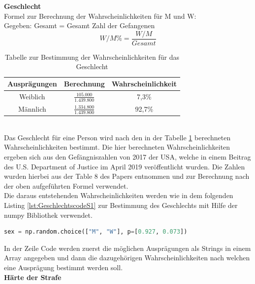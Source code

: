\begin{onehalfspace}
\textbf{Geschlecht}\\
Formel zur Berechnung der Wahrscheinlichkeiten für \ac{M} und \ac{W}:\\
Gegeben: Gesamt = Gesamt Zahl der Gefangenen\\
\begin{equation}
    W/M\% = \frac{W/M}{Gesamt}\label{eq:Sz1Mänlich}
\end{equation}
\begin{table}[!h]
    \centering
    \begin{tabular}{|c|c|c|}
    \hline
    \textbf{Ausprägungen} & \textbf{Berechnung} & \textbf{Wahrscheinlichkeit} \\ \hline
    Weiblich              &\rule{0pt}{18pt} $\frac{105.000}{1.439.800}$  & 7,3\% \\[8pt] \hline
    Männlich              & \rule{0pt}{18pt}$\frac{1.334.800}{1.439.800}$     & 92,7\%  \\[8pt] \hline
    \end{tabular}
\caption{Tabelle zur Bestimmung der Wahrscheinlichkeiten für das Geschlecht}
\label{table:3}
\end{table}\\
Das Geschlecht für eine Person wird nach den in der Tabelle \ref{table:3} berechneten Wahrscheinlichkeiten bestimmt. Die hier berechneten Wahrscheinlichkeiten ergeben sich aus den Gefängniszahlen von 2017 der USA, welche in einem Beitrag des U.S. Department of Justice im April 2019 veröffentlicht wurden. Die Zahlen wurden hierbei aus der \glqq{}Table 8\grqq{} des Papers entnommen und zur Berechnung nach der oben aufgeführten Formel verwendet.\cite[S. 17]{Bronson2017}\\
Die daraus entstehenden Wahrscheinlichkeiten werden wie in dem folgenden Listing \ref{lst:GeschlechtscodeS1} zur Bestimmung des Geschlechts mit Hilfe der \glqq{}numpy\grqq{} Bibliothek verwendet.\\
\begin{lstlisting}[language=Python,label={lst:GeschlechtscodeS1},caption=Codezeile zur Bestimmung des Geschlechts einer Person nach angegebenen Wahrscheinlichkeiten]
sex = np.random.choice(["M", "W"], p=[0.927, 0.073])
\end{lstlisting}
In der Zeile Code werden zuerst die möglichen Ausprägungen als Strings in einem Array angegeben und dann die dazugehörigen Wahrscheinlichkeiten nach welchen eine Ausprägung bestimmt werden soll.\\
\textbf{Härte der Strafe}\\

\end{onehalfspace}
